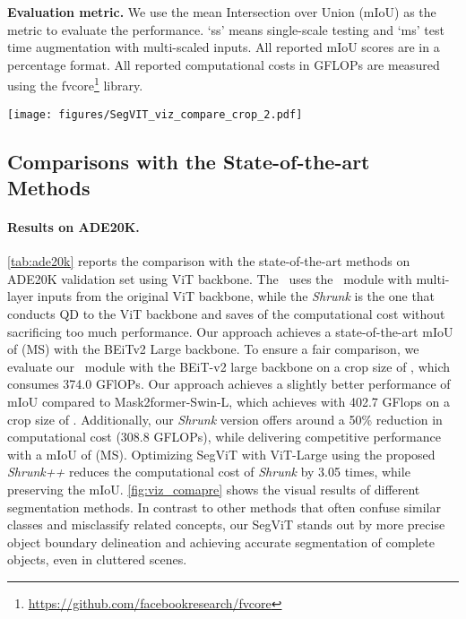 \noindent\textbf{Evaluation metric.} We use the mean Intersection over Union (mIoU) as the metric to evaluate the performance. `ss' means single-scale testing and `ms' test time augmentation with multi-scaled  inputs. All reported mIoU scores are in a percentage format. All reported computational costs in GFLOPs are measured using the fvcore\footnote{\url{https://github.com/facebookresearch/fvcore}} library.


\begin{figure*}[!ht]
    \centering
    \texttt{[image: figures/SegVIT\_viz\_compare\_crop\_2.pdf]}
    \caption{ Visuals results of different segmentation networks and plain ViT backbones on the ADE20K validation set~\cite{ade20k}. It includes the following models: (a) Segmenter \cite{strudel2021segmenter} with ViT large, (b) StructToken \cite{lin2022structtoken} with ViT large, (c) UPerNet \cite{Upernet} with BEiT large, and (d) SegViT V2 with BEiTv2 large. The results demonstrate that our methods effectively generate accurate segmentation masks and unlock the potential of plain ViT. Zoom in for a better view. }
    \label{fig:viz_comapre}
\end{figure*}

\subsection{Comparisons with the State-of-the-art Methods}
\paragraph{Results on ADE20K.}
\cref{tab:ade20k} reports the comparison with the state-of-the-art methods on ADE20K validation set using ViT backbone. The \seg\ uses the \atm\ module with multi-layer inputs from the original ViT backbone, while the \emph{Shrunk} is the one that conducts QD to the ViT backbone and  saves  of the computational cost without sacrificing too much performance. Our approach achieves a state-of-the-art mIoU of  (MS) with the BEiTv2 Large backbone.
To ensure a fair comparison, we evaluate our \seg\ module with the BEiT-v2 large backbone on a crop size of , which consumes 374.0 GFlOPs. Our approach achieves a slightly better performance of  mIoU compared to Mask2former-Swin-L, which achieves  with 402.7 GFlops on a crop size of . Additionally, our \emph{Shrunk} version offers around a 50\% reduction in computational cost (308.8 GFLOPs), while delivering competitive performance with a mIoU of  (MS). Optimizing SegViT with ViT-Large using the proposed \emph{Shrunk++} reduces the computational cost of \emph{Shrunk} by 3.05 times, while preserving the mIoU. 
\cref{fig:viz_comapre} shows the visual results of different segmentation methods. In contrast to other methods that often confuse similar classes and misclassify related concepts, our SegViT stands out by more precise object boundary delineation and achieving accurate segmentation of complete objects, even in cluttered scenes. 

